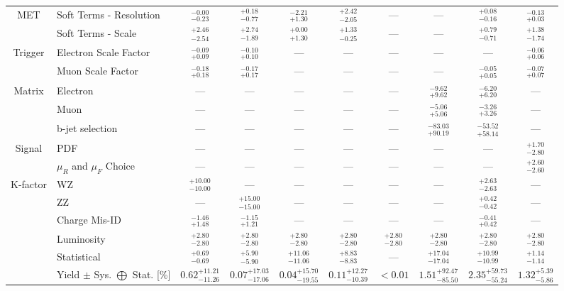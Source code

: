 \begin{tabular}{|cl||cccccc|c||c|}
\hline
\multirow{2}{*}{MET}
&Soft Terms - Resolution &  $^{-0.00}_{-0.23}$  &  $^{+0.18}_{-0.77}$  &  $^{-2.21}_{+1.30}$  &  $^{+2.42}_{-2.05}$  & --- & --- &  $^{+0.08}_{-0.16}$  &  $^{-0.13}_{+0.03}$ \\ 
\cline{2-10}
&Soft Terms - Scale &  $^{+2.46}_{-2.54}$  &  $^{+2.74}_{-1.89}$  &  $^{+0.00}_{+1.30}$  &  $^{+1.33}_{-0.25}$  & --- & --- &  $^{+0.79}_{-0.71}$  &  $^{+1.38}_{-1.74}$ \\ 
\hline
\multirow{2}{*}{Trigger}
&Electron Scale Factor &  $^{-0.09}_{+0.09}$  &  $^{-0.10}_{+0.10}$  & --- & --- & --- & --- & --- &  $^{-0.06}_{+0.06}$ \\ 
\cline{2-10}
&Muon Scale Factor &  $^{-0.18}_{+0.18}$  &  $^{-0.17}_{+0.17}$  & --- & --- & --- & --- &  $^{-0.05}_{+0.05}$  &  $^{-0.07}_{+0.07}$ \\ 
\hline
\multirow{2}{*}{Matrix}
&Electron & --- & --- & --- & --- & --- &  $^{-9.62}_{+9.62}$  &  $^{-6.20}_{+6.20}$  & ---\\ 
\cline{2-10}
\multirow{2}{*}{Method}
&Muon & --- & --- & --- & --- & --- &  $^{-5.06}_{+5.06}$  &  $^{-3.26}_{+3.26}$  & ---\\ 
\cline{2-10}
&b-jet selection & --- & --- & --- & --- & --- &  $^{-83.03}_{+90.19}$  &  $^{-53.52}_{+58.14}$  & ---\\ 
\hline
\multirow{2}{*}{Signal}
&PDF & --- & --- & --- & --- & --- & --- & --- &  $^{+1.70}_{-2.80}$ \\ 
\cline{2-10}
&$\mu_{R}$ and $\mu_{F}$ Choice & --- & --- & --- & --- & --- & --- & --- &  $^{+2.60}_{-2.60}$ \\ 
\hline
\multirow{2}{*}{K-factor}
&WZ &  $^{+10.00}_{-10.00}$  & --- & --- & --- & --- & --- &  $^{+2.63}_{-2.63}$  & ---\\ 
\cline{2-10}
&ZZ & --- &  $^{+15.00}_{-15.00}$  & --- & --- & --- & --- &  $^{+0.42}_{-0.42}$  & ---\\ 
\hline
&Charge Mis-ID &  $^{-1.46}_{+1.48}$  &  $^{-1.15}_{+1.21}$  & --- & --- & --- & --- &  $^{-0.41}_{+0.42}$  & ---\\ 
\hline
&Luminosity &  $^{+2.80}_{-2.80}$  &  $^{+2.80}_{-2.80}$  &  $^{+2.80}_{-2.80}$  &  $^{+2.80}_{-2.80}$  &  $^{+2.80}_{-2.80}$  &  $^{+2.80}_{-2.80}$  &  $^{+2.80}_{-2.80}$  &  $^{+2.80}_{-2.80}$ \\ 
\hline
&Statistical &  $^{+0.69}_{-0.69}$  &  $^{+5.90}_{-5.90}$  &  $^{+11.06}_{-11.06}$  &  $^{+8.83}_{-8.83}$  & --- &  $^{+17.04}_{-17.04}$  &  $^{+10.99}_{-10.99}$  &  $^{+1.14}_{-1.14}$ \\ 
\hline
\hline
&Yield $\pm$ Sys. $\bigoplus$ Stat. [\%] &  $0.62^{+11.21}_{-11.26}$  &  $0.07^{+17.03}_{-17.06}$  &  $0.04^{+15.70}_{-19.55}$  &  $0.11^{+12.27}_{-10.39}$  &  $< 0.01$  &  $1.51^{+92.47}_{-85.50}$  &  $2.35^{+59.73}_{-55.24}$  &  $1.32^{+5.39}_{-5.86}$ \\ 
\hline
\end{tabular}
